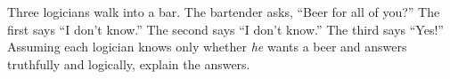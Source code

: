 Three logicians walk into a bar. The bartender asks, ``Beer for all of you?'' The first says ``I don't know.'' The second says ``I don't know.'' The third says ``Yes!'' Assuming each logician knows only whether \emph{he} wants a beer and answers truthfully and logically, explain the answers.
